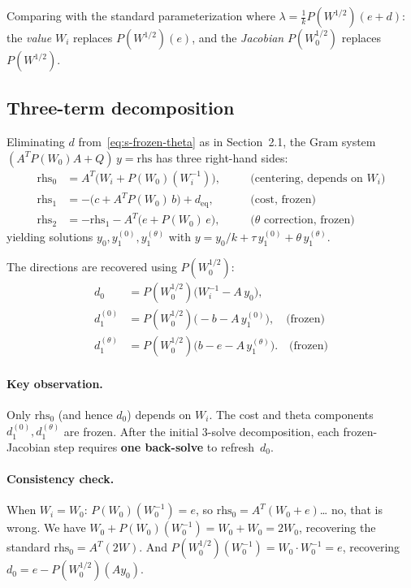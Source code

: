 \documentclass{article}
\begin{document}
Comparing with the standard parameterization where
$\lambda = \frac{1}{k}P(W^{1/2})(e + d)$:
the \emph{value} $W_i$ replaces $P(W^{1/2})(e)$,
and the \emph{Jacobian} $P(W_0^{1/2})$ replaces $P(W^{1/2})$.

\subsection{Three-term decomposition}

Eliminating $d$ from~\eqref{eq:s-frozen-theta} as in Section~2.1, the
Gram system $(A^T P(W_0) A + Q)\,y = \text{rhs}$ has three right-hand sides:
\begin{align}
  \text{rhs}_0 &= A^T\bigl(W_i + P(W_0)(W_i^{-1})\bigr),
    &\quad &\text{(centering, depends on $W_i$)} \\
  \text{rhs}_1 &= -\bigl(c + A^T P(W_0)\,b\bigr) + d_{\text{eq}},
    &\quad &\text{(cost, frozen)} \\
  \text{rhs}_2 &= -\text{rhs}_1 - A^T\bigl(e + P(W_0)\,e\bigr),
    &\quad &\text{($\theta$ correction, frozen)}
\end{align}
yielding solutions $y_0, y_1^{(0)}, y_1^{(\theta)}$ with $y = y_0/k
+ \tau\,y_1^{(0)} + \theta\,y_1^{(\theta)}$.

The directions are recovered using $P(W_0^{1/2})$:
\begin{align}
  d_0 &= P(W_0^{1/2})\bigl(W_i^{-1} - A\,y_0\bigr),
    \label{eq:d0-frozen-theta} \\
  d_1^{(0)} &= P(W_0^{1/2})\bigl(-b - A\,y_1^{(0)}\bigr),
    \quad\text{(frozen)} \label{eq:d10-frozen-theta} \\
  d_1^{(\theta)} &= P(W_0^{1/2})\bigl(b - e - A\,y_1^{(\theta)}\bigr).
    \quad\text{(frozen)} \label{eq:d1t-frozen-theta}
\end{align}

\paragraph{Key observation.}  Only $\text{rhs}_0$ (and hence $d_0$)
depends on $W_i$.  The cost and theta components $d_1^{(0)},
d_1^{(\theta)}$ are frozen.  After the initial 3-solve decomposition,
each frozen-Jacobian step requires \textbf{one back-solve} to refresh~$d_0$.

\paragraph{Consistency check.}  When $W_i = W_0$:
$P(W_0)(W_0^{-1}) = e$, so $\text{rhs}_0 = A^T(W_0 + e)$\ldots
no, that is wrong.  We have $W_0 + P(W_0)(W_0^{-1}) = W_0 + W_0 = 2W_0$,
recovering the standard $\text{rhs}_0 = A^T(2W)$.  And
$P(W_0^{1/2})(W_0^{-1}) = W_0 \cdot W_0^{-1} = e$, recovering
$d_0 = e - P(W_0^{1/2})(Ay_0)$. \checkmark
\end{document}
